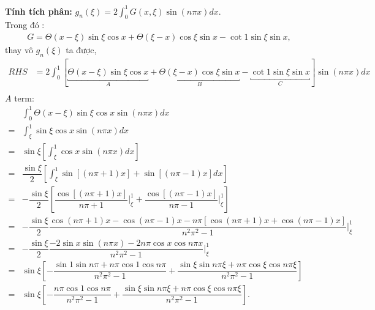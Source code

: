 \documentclass{article}
\newcommand{\dps}{\displaystyle}
\newcommand{\f}[2]{\dfrac{#1}{#2}}
\newcommand{\at}[2]{\bigg\rvert_{#1}^{#2} }
\begin{document}
\textbf{Tính tích phân:} $g_n (\xi) = 2 \dps\int_{0}^{1} G(x,\xi) \sin (n\pi x) dx$. \\
Trong đó :
\begin{align*}
	G = \Theta (x-\xi) \sin \xi \cos x + \Theta (\xi - x) \cos \xi \sin x - \cot 1 \sin \xi \sin x,
\end{align*}
thay vô $g_n (\xi)$ ta được,
\begin{align*}
	RHS & = 2 \int_{0}^{1} \left[\underbracket{\Theta (x-\xi) \sin \xi \cos x}_A + \underbracket{\Theta (\xi - x) \cos \xi \sin x}_B - \underbracket{\cot 1 \sin \xi \sin x}_C \right] \sin (n\pi x) dx \\
\end{align*}
$A$ term:
\begin{align*}
	  & \int_{0}^{1} \Theta (x-\xi) \sin \xi \cos x \sin (n\pi x) dx                                                                                                \\
	= & \int_{\xi}^{1} \sin \xi \cos x \sin (n\pi x) dx                                                                                                             \\
	= & \sin \xi \left[\int_{\xi}^{1} \cos x \sin (n\pi x) dx\right]                                                                                                \\
	= & \f{\sin \xi}{2} \left[\int_{\xi}^{1} \sin [(n\pi+1)x] + \sin [(n\pi-1)x] dx\right]                                                                          \\
	= & -\f{\sin \xi}{2} \left[ \f{\cos [(n\pi+1)x]}{n\pi+1} \at{\xi}{1} + \f{\cos [(n\pi-1)x]}{n\pi-1} \at{\xi}{1}\right]                                          \\
	= & -\f{\sin \xi}{2} \f{\cos(n\pi+1)x - \cos(n\pi-1)x - n\pi[\cos(n\pi + 1)x + \cos(n\pi - 1)x]}{n^2\pi^2 - 1} \at{\xi}{1}                                      \\
	= & -\f{\sin \xi}{2} \f{-2 \sin x \sin (n\pi x) - 2 n \pi \cos x \cos n\pi x}{n^2\pi^2 - 1} \at{\xi}{1}                                                         \\
	= & \sin \xi \left[ -\f{\sin 1 \sin n\pi + n \pi \cos 1 \cos n\pi}{n^2\pi^2 - 1} + \f{\sin \xi \sin n\pi\xi + n \pi \cos \xi \cos n\pi\xi}{n^2\pi^2 - 1} \right] \\
	= & \sin \xi \left[ -\f{ n \pi \cos 1 \cos n\pi}{n^2\pi^2 - 1} + \f{\sin \xi \sin n\pi\xi + n \pi \cos \xi \cos n\pi\xi}{n^2\pi^2 - 1} \right].                  \\
\end{align*}
\end{document}

